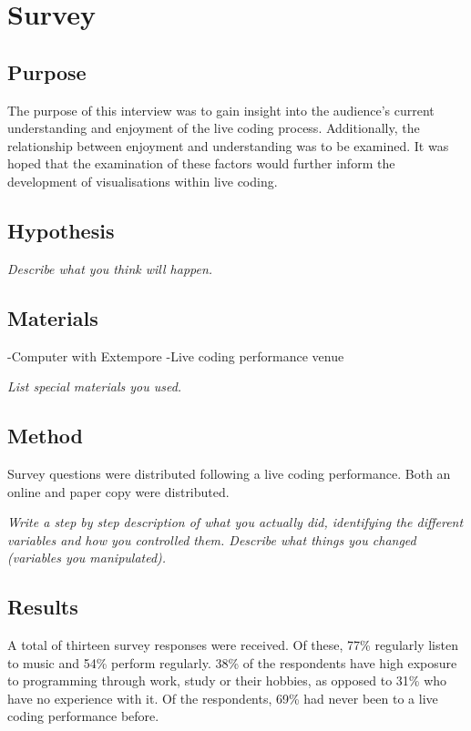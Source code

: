 
\chapter{Survey}
\label{cha:survey}

\section{Purpose}

The purpose of this interview was to gain insight into the audience’s current understanding and enjoyment of the live coding process. Additionally, the relationship between enjoyment and understanding was to be examined. It was hoped that the examination of these factors would further inform the development of visualisations within live coding.

\section{Hypothesis}



\textit{Describe what you think will happen.}
\section{Materials}

-Computer with Extempore
-Live coding performance venue

\textit{List special materials you used.}
\section{Method}
Survey questions were distributed following a live coding performance. Both an online and paper copy were distributed.

\textit{Write a step by step description of what you actually did, identifying the different variables and how you controlled them. Describe what things you changed (variables you manipulated).}
\section{Results}
A total of thirteen survey responses were received. Of these, 77\% regularly listen to music and 54\% perform regularly. 38\% of the respondents have high exposure to programming through work, study or their hobbies, as opposed to 31\% who have no experience with it. Of the respondents, 69\% had never been to a live coding performance before.

